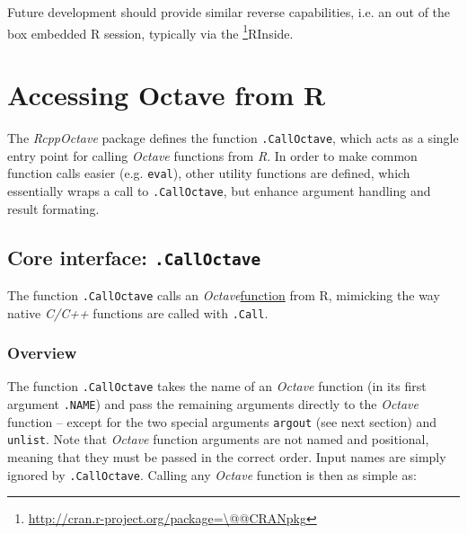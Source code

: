 \documentclass[english,10pt,a4paper]{article}\usepackage[]{graphicx}\usepackage[]{color}
\makeatletter
\let\proglang=\textit
\let\code=\texttt
\newcommand{\pkgname}[1]{\textit{#1}\xspace}
\newcommand{\Rpkg}[1]{\pkgname{#1} package\xspace}
\newcommand{\CRANurl}[1]{\url{http://cran.r-project.org/package=#1}}
\def\CRANpkg{\@ifstar\@CRANpkg\@@CRANpkg}
\def\@CRANpkg#1{\href{http://cran.r-project.org/package=#1}{\pkgname{#1}}\footnote{\CRANurl{#1}}}
\def\@@CRANpkg#1{\href{http://cran.r-project.org/package=#1}{\pkgname{#1}} package\footnote{\CRANurl{#1}}}
\newcommand{\octave}{\proglang{Octave}\xspace}
\makeatother
\begin{document}
Future development should provide similar reverse capabilities, i.e. an out
of the box embedded R session, typically via the \CRANpkg{RInside}.

\section{Accessing Octave from R}

The \Rpkg{RcppOctave} defines the function \code{.CallOctave}, which acts as a
single entry point for calling \octave functions from \proglang{R}.
In order to make common function calls easier (e.g. \code{eval}), other utility
functions are defined, which essentially wraps a call to \code{.CallOctave}, but
enhance argument handling and result formating.

\subsection{Core interface: \texttt{.CallOctave}}
The function \code{.CallOctave} calls an \octave \underline{function}
from R, mimicking the way native \proglang{C/C++} functions are called with
\code{.Call}.

\subsubsection{Overview}

The function \code{.CallOctave} takes the name of an \octave function (in its
first argument \code{.NAME}) and pass the remaining arguments directly to the
\octave function -- except for the two special arguments \code{argout} (see next
section) and \code{unlist}.
Note that \octave function arguments are not named and positional, meaning that
they must be passed in the correct order.
Input names are simply ignored by \code{.CallOctave}.
Calling any \octave function is then as simple as: 
\end{document}
